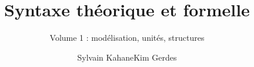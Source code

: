\author{Sylvain Kahane\lastand Kim Gerdes}
\title{Syntaxe théorique et formelle}
\subtitle{Volume 1 : modélisation, unités, structures}
\renewcommand{\lsSeries}{tbls}
\renewcommand{\lsSeriesNumber}{9}
\renewcommand{\lsID}{241}
